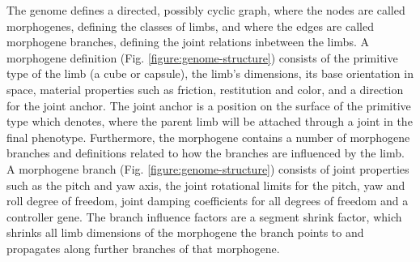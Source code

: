 \documentclass[main]{subfiles}
\begin{document}

The genome defines a directed, possibly cyclic graph, where the nodes are called morphogenes, defining the classes of limbs, and where the edges are called morphogene branches, defining the joint relations inbetween the limbs. A morphogene definition (Fig. \ref{figure:genome-structure}) consists of the primitive type of the limb (a cube or capsule), the limb's dimensions, its base orientation in space, material properties such as friction, restitution and color, and a direction for the joint anchor. The joint anchor is a position on the surface of the primitive type which denotes, where the parent limb will be attached through a joint in the final phenotype. Furthermore, the morphogene contains a number of morphogene branches and definitions related to how the branches are influenced by the limb. \\

A morphogene branch (Fig. \ref{figure:genome-structure}) consists of joint properties such as the pitch and yaw axis, the joint rotational limits for the pitch, yaw and roll degree of freedom, joint damping coefficients for all degrees of freedom and a controller gene.
The branch influence factors are a segment shrink factor, which shrinks all limb dimensions of the morphogene the branch points to and propagates along further branches of that morphogene.

\end{document}

